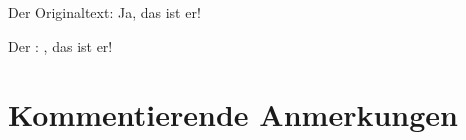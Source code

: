 \documentclass{book}
\begin{document}
\begin{pages}
\begin{Leftside}
\beginnumbering
\pstart

Der Originaltext: \blindtext[2] Ja, das ist er!
\pend
\endnumbering   
\end{Leftside}

\begin{Rightside}
\beginnumbering
\pstart

Der : \blindtext[3] , das ist er!
\pend

\endnumbering
\end{Rightside}
\end{pages}
\Pages

\section{Kommentierende Anmerkungen}

\end{document}
